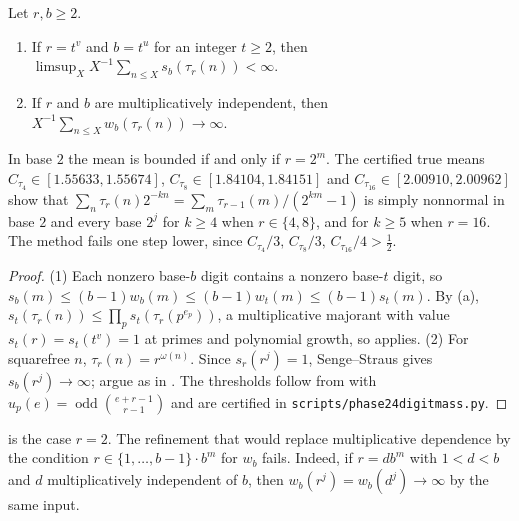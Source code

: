 \documentclass[11pt]{article}
\DeclareMathOperator{\odd}{odd}
\newcommand{\ttbreak}{\discretionary{}{}{}}
\newcommand{\ttt}[1]{\texttt{\begingroup\def\_{\textunderscore\ttbreak}#1\endgroup}}
\begin{document}
\begin{theorem}\label{thm:dichotomy}
Let $r,b\ge2$.
\begin{enumerate}[label=\textup{(\arabic*)},nosep]
\item If $r=t^v$ and $b=t^u$ for an integer $t\ge2$, then $\limsup_XX^{-1}\sum_{n\le X}s_b(\tau_r(n))<\infty$.
\item If $r$ and $b$ are multiplicatively independent, then $X^{-1}\sum_{n\le X}w_b(\tau_r(n))\to\infty$.
\end{enumerate}
In base $2$ the mean is bounded if and only if $r=2^m$. The certified true means $C_{\tau_4}\in[1.55633,1.55674]$, $C_{\tau_8}\in[1.84104,1.84151]$ and $C_{\tau_{16}}\in[2.00910,2.00962]$ show that $\sum_n\tau_r(n)2^{-kn}=\sum_m\tau_{r-1}(m)/(2^{km}-1)$ is simply nonnormal in base $2$ and every base $2^j$ for $k\ge4$ when $r\in\{4,8\}$, and for $k\ge5$ when $r=16$. The method fails one step lower, since $C_{\tau_4}/3,\,C_{\tau_8}/3,\,C_{\tau_{16}}/4>\frac12$.
\end{theorem}

\begin{proof}
(1) Each nonzero base-$b$ digit contains a nonzero base-$t$ digit, so $s_b(m)\le(b-1)w_b(m)\le(b-1)w_t(m)\le(b-1)s_t(m)$. By (a), $s_t(\tau_r(n))\le\prod_ps_t(\tau_r(p^{e_p}))$, a multiplicative majorant with value $s_t(r)=s_t(t^v)=1$ at primes and polynomial growth, so  applies. (2) For squarefree $n$, $\tau_r(n)=r^{\omega(n)}$. Since $s_r(r^j)=1$, Senge--Straus gives $s_b(r^j)\to\infty$; argue as in . The thresholds follow from  with $u_p(e)=\odd\binom{e+r-1}{r-1}$ and are certified in \ttt{scripts/phase24\_digit\_mass.py}.
\end{proof}

 is the case $r=2$. The refinement that would replace multiplicative dependence by the condition $r\in\{1,\dots,b-1\}\cdot b^m$ for $w_b$ fails. Indeed, if $r=db^m$ with $1<d<b$ and $d$ multiplicatively independent of $b$, then $w_b(r^j)=w_b(d^j)\to\infty$ by the same input.
\end{document}
